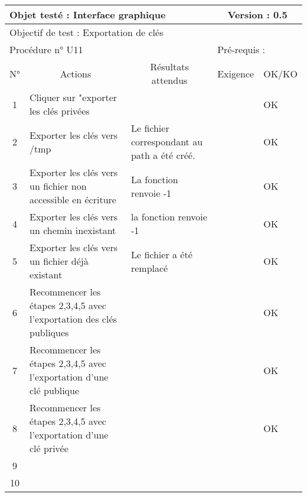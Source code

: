 \documentclass{../res/univ-projet}
\begin{document}
\begin{center}
    \begin{tabular}{|c|p{5cm}|p{5cm}|p{1.5cm}|p{1.5cm}|}
      \hline
      \multicolumn{3}{|l|}{Objet testé : Interface graphique} & \multicolumn{2}{c|}{Version : 0.5}\\ \hline
      \multicolumn{5}{|l|}{Objectif de test : Exportation de clés}\\ \hline
      \multicolumn{3}{|l|}{Procédure n° U11} & \multicolumn{2}{p{3cm}|}{Pré-requis : }\\ \hline
      \multicolumn{1}{|c|}{N°} & \multicolumn{1}{c|}{Actions} & \multicolumn{1}{c|}{Résultats attendus} & 
      \multicolumn{1}{c|}{Exigence} & \multicolumn{1}{c|}{OK/KO}\\ \hline
      1 & Cliquer sur "exporter les clés privées &  &  & OK \\
      2 & Exporter les clés vers /tmp & Le fichier correspondant au path a été créé. &  & OK \\
      3 & Exporter les clés vers un fichier non accessible en écriture & La fonction renvoie -1 &  & OK \\
      4 & Exporter les clés vers un chemin inexistant & la fonction renvoie -1 &  & OK \\
      5 & Exporter les clés vers un fichier déjà existant & Le fichier a été remplacé &  & OK \\
      6 & Recommencer les étapes 2,3,4,5 avec l'exportation des clés publiques &  &  & OK\\
      7 & Recommencer les étapes 2,3,4,5 avec l'exportation d'une clé publique &  &  & OK\\
      8 & Recommencer les étapes 2,3,4,5 avec l'exportation d'une clé privée &  &  & OK\\
      9 &  &  &  & \\ 
      10 &  &  &  & \\ 
  \hline
    \end{tabular}
    \vskip 2.2cm


\end{center}
\end{document}
